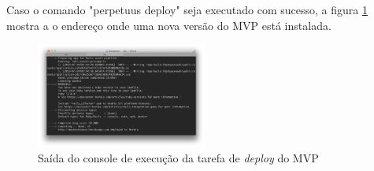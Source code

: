 Caso o comando "perpetuus deploy" seja executado com sucesso, a figura \ref{fig:fig13} mostra a o endere\c{c}o onde uma nova vers\~ao do MVP est\'a instalada.

\begin{figure}[h]
  \centering
  \includegraphics[width=0.5\textwidth]{./fig/setup5}
  \caption{Sa\'ida do console de execu\c{c}\~ao da tarefa de \emph{deploy} do MVP}
  \label{fig:fig13}
\end{figure}


